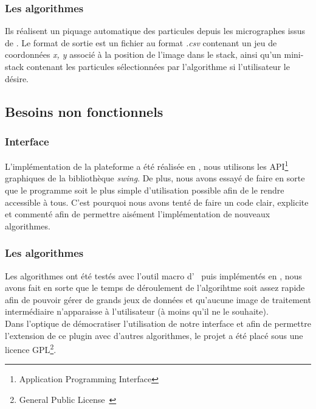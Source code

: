 \documentclass[12pt,a4paper]{report}
\begin{document}
\subsubsection{Les algorithmes}

Ils réalisent un piquage automatique des particules depuis les micrographes issus de \cme. Le format de sortie est un fichier au format \emph{.csv} contenant un jeu de coordonnées \emph{x, y} associé à la position de l'image dans le stack, ainsi qu'un mini-stack contenant les particules sélectionnées par l'algorithme si l'utilisateur le désire.

\subsection{Besoins non fonctionnels}

\subsubsection{Interface}

\noindent
L'implémentation de la plateforme a été réalisée en \java, nous utilisons les API\footnote{Application Programming Interface} graphiques de la bibliothèque \emph{swing}. De plus, nous avons essayé de faire en sorte que le programme soit le plus simple d'utilisation possible afin de le rendre accessible à tous. C'est pourquoi nous avons tenté de faire un code clair, explicite et commenté afin de permettre aisément l'implémentation de nouveaux algorithmes.

\subsubsection{Les algorithmes}

\noindent
Les algorithmes ont été testés avec l'outil macro d' \imj ~puis implémentés en \java, nous avons fait en sorte que le temps de déroulement de l'algorihtme soit assez rapide afin de pouvoir gérer de grands jeux de données et qu'aucune image de traitement intermédiaire n'apparaisse à l'utilisateur (à moins qu'il ne le souhaite).\\

Dans l'optique de démocratiser l'utilisation de notre interface et afin de permettre l'extension de ce plugin avec d'autres algorithmes, le projet a été placé sous une licence GPL\footnote{General Public License~\cite{GPL:url}}.

\noindent
\end{document}

